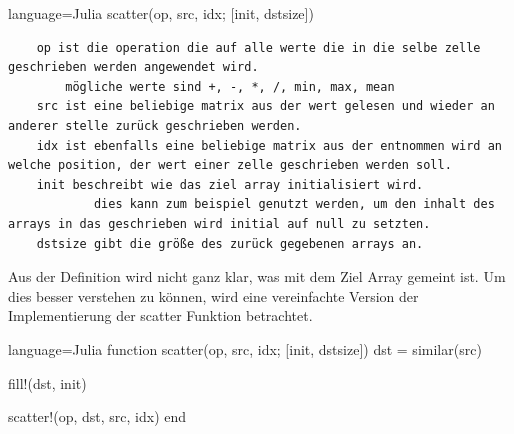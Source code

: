 \begin{listing}{language=Julia}
	scatter(op, src, idx; [init, dstsize])
\end{listing}

\begin{verbatim}
	op ist die operation die auf alle werte die in die selbe zelle geschrieben werden angewendet wird.
		mögliche werte sind +, -, *, /, min, max, mean
	src ist eine beliebige matrix aus der wert gelesen und wieder an anderer stelle zurück geschrieben werden.
	idx ist ebenfalls eine beliebige matrix aus der entnommen wird an welche position, der wert einer zelle geschrieben werden soll.
	init beschreibt wie das ziel array initialisiert wird.
			dies kann zum beispiel genutzt werden, um den inhalt des arrays in das geschrieben wird initial auf null zu setzten.
	dstsize gibt die größe des zurück gegebenen arrays an.
\end{verbatim}

Aus der Definition wird nicht ganz klar, was mit dem Ziel Array gemeint ist.
Um dies besser verstehen zu können, wird eine vereinfachte Version der Implementierung der scatter Funktion betrachtet.

\begin{listing}{language=Julia}
	function scatter(op, src, idx; [init, dstsize])
		dst = similar(src)
		
		fill!(dst, init)
		
		scatter!(op, dst, src, idx)
	end
\end{listing}

